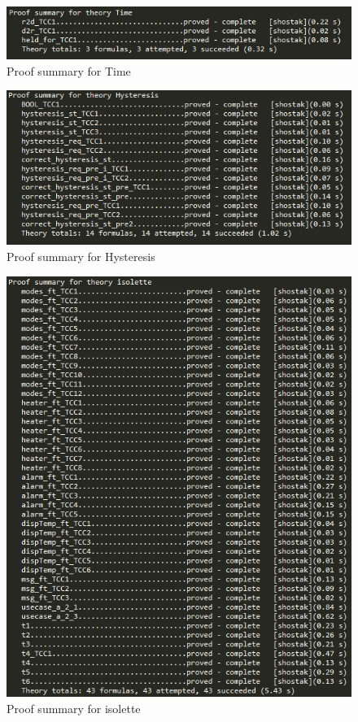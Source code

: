 \documentclass[fontsize=12pt,paper=letter,twoside]{scrartcl}
\begin{document}
\FloatBarrier

\begin{figure}[!htb]
\begin{center}
\includegraphics[width=.8\textwidth]{pics/prf_Time.png}
\end{center}
\caption{Proof summary for Time}
\label{fig:Time}
\end{figure}

\begin{figure}[!htb]
\begin{center}
\includegraphics[width=.8\textwidth]{pics/prf_Hysteresis.png}
\end{center}
\caption{Proof summary for Hysteresis}
\label{fig:Hysteresis}
\end{figure}

\begin{figure}[!htb]
\begin{center}
\includegraphics[width=.8\textwidth]{pics/prf_isolette.png}
\end{center}
\caption{Proof summary for isolette}
\label{fig:prfisolette}
\end{figure}
\end{document}
